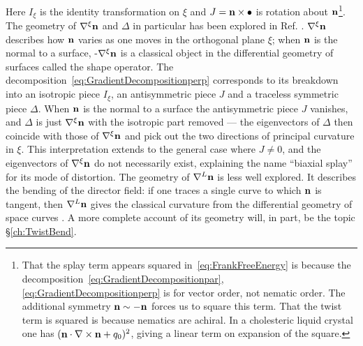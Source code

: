 Here $I_\xi$ is the identity transformation on $\xi$ and $J= \bf n \times \bullet$ is rotation about $\bf n$\footnote{That the splay term appears squared in~\eqref{eq:FrankFreeEnergy} is because the decomposition~\eqref{eq:GradientDecompositionpar},\eqref{eq:GradientDecompositionperp} is for vector order, not nematic order. The additional symmetry $\bf n \sim -n$ forces us to square this term. That the twist term is squared is because nematics are achiral. In a cholesteric liquid crystal \citep{Bellar2014} one has $({\bf n} \cdot \nabla \times {\bf n}+q_0)^2$, giving a linear term on expansion of the square.}. The geometry of $\nabla^\xi \bf n$ and $\Delta$ in particular has been explored in Ref. \citep{Machon2016b}. $\nabla^\xi \bf n$ describes how $\bf n$ varies as one moves in the orthogonal plane $\xi$; when $\bf n$ is the normal to a surface, -$\nabla^\xi \bf n$ is a classical object in the differential geometry of surfaces called the shape operator. The decomposition~\eqref{eq:GradientDecompositionperp} corresponds to its breakdown into an isotropic piece $I_\xi$, an antisymmetric piece $J$ and a traceless symmetric piece $\Delta$. When $\bf n$ is the normal to a surface the antisymmetric piece $J$ vanishes, and $\Delta$ is just $\nabla^\xi \bf n$ with the isotropic part removed --- the eigenvectors of $\Delta$ then coincide with those of $\nabla^\xi \bf n$ and pick out the two directions of principal curvature in $\xi$. This interpretation extends to the general case where $J \neq 0$, and the eigenvectors of $\nabla^\xi \bf n$ do not necessarily exist, explaining the name ``biaxial splay'' for its mode of distortion. The geometry of $\nabla^L \bf n$ is less well explored. It describes the bending of the director field: if one traces a single curve to which $\bf n$ is tangent, then $\nabla^L \bf n $ gives the classical curvature from the differential geometry of space curves \citep{DoCarmoBook}. A more complete account of its geometry will, in part, be the topic \S\ref{ch:TwistBend}.
 
